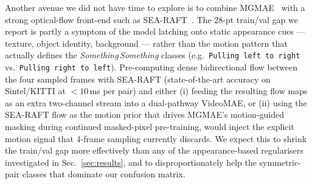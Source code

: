 \documentclass[10pt,twocolumn,letterpaper]{article}
\begin{document}
Another avenue we did not have time to explore
is to combine MGMAE~\cite{huang2023mgmae} with a strong optical-flow front-end such
as SEA-RAFT~\cite{wang2024searaft}. The 28-pt train/val gap we
report is partly a symptom of the model latching onto static
appearance cues --- texture, object identity, background --- rather
than the motion pattern that actually defines the
\emph{Something\,Something} classes (e.g.\ \texttt{Pulling left
to right} vs.\ \texttt{Pulling right to left}). Pre-computing
dense bidirectional flow between the four sampled frames with
SEA-RAFT (state-of-the-art accuracy on Sintel/KITTI at
$<10$\,ms per pair) and either (i) feeding the resulting flow
maps as an extra two-channel stream into a dual-pathway
VideoMAE, or (ii) using the SEA-RAFT flow as the motion prior
that drives MGMAE's motion-guided masking during continued
masked-pixel pre-training, would inject the explicit motion
signal that 4-frame sampling currently discards. We expect this
to shrink the train/val gap more effectively than any of the
appearance-based regularisers investigated in Sec.~\ref{sec:results},
and to disproportionately help the symmetric-pair classes that
dominate our confusion matrix.
\end{document}
